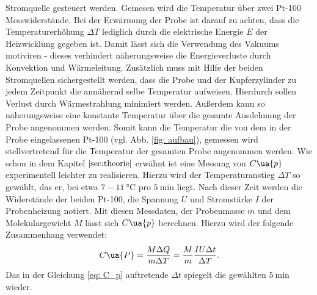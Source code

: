 Stromquelle gesteuert werden. Gemesen wird die Temperatur über zwei
Pt-100 Messwiderstände. Bei der Erwärmung der Probe ist darauf zu achten, dass
die Temperaturerhöhung $\Delta T$ lediglich durch die elektrische Energie $E$
der Heizwicklung gegeben ist. Damit lässt sich die Verwendung des Vakuums motiviren -
dieses verhindert näherungsweise die Energieverluste durch Konvektion und
Wärmeleitung. Zusätzlich muss mit Hilfe der beiden Stromquellen sichergestellt
werden, dass die Probe und der Kupferzylinder zu jedem Zeitpunkt die annähernd
selbe Temperatur aufweisen. Hierdurch sollen Verlust durch Wärmestrahlung minimiert werden.
Außerdem kann so näherungsweise eine konstante Temperatur über die gesamte Ausdehnung der Probe
angenommen werden. Somit kann die Temperatur die von dem in der Probe eingelassenen Pt-100 (vgl. Abb. \ref{fig: aufbau}), gemessen wird stellvertretend für die Temperatur der gesamten Probe angenommen werden.
Wie schon in dem Kapitel $\ref{sec:theorie}$ erwähnt
ist eine Messung von $C\ua{p}$ experimentell leichter zu realisieren.
Hierzu wird der Temperaturanstieg $\Delta T$ so gewählt, das er, bei
etwa $7-\SI{11}{\degreeCelsius}$ pro $\SI{5}{\minute}$ liegt. Nach dieser Zeit werden die
Widerstände der beiden Pt-100, die Spannung $U$ und Stromstärke $I$ der Probenheizung notiert.
Mit diesen Messdaten, der Probenmasse $m$ und dem Molekulargewicht $M$ lässt sich $C\ua{p}$
berechnen. Hierzu wird der folgende Zusammenhang verwendet:
\begin{equation}
  \label{eq: C_p}
  C\ua{P}=\frac{M \Delta Q}{m\Delta T} = \frac{M}{m}\frac{IU\Delta t}{\Delta T}.
\end{equation}
Das in der Gleichung \eqref{eq: C_p} auftretende $\Delta t$ spiegelt die gewählten $\SI{5}{\minute}$
wieder.

